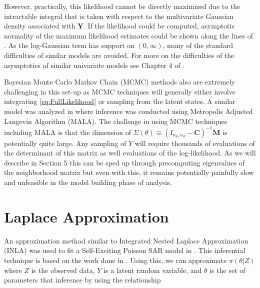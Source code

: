 \documentclass[11pt]{isuthesis}
\begin{document}
	However, practically, this likelihood cannot be directly maximized due to the intractable integral that is taken with respect to the multivariate Gaussian density associated with $\boldsymbol{Y}$.  If the likelihood could be computed, asymptotic normality of the maximum likelihood estimates could be shown along the lines of \cite{fokianos2009poisson}.  As the log-Gaussian term has support on $(0,\infty)$, many of the standard difficulties of similar models are avoided.  For more on the difficulties of the asymptotics of similar univariate models see Chapter 4 of \cite{davis2016handbook}. 
	
	Bayesian Monte Carlo Markov Chain (MCMC) methods also are extremely challenging in this set-up as MCMC techniques will generally either involve integrating \eqref{eq:FullLikelihood} or sampling from the latent states.  A similar model was analyzed in \cite{mohler2013modeling} where inference was conducted using Metropolis Adjusted Langevin Algorithm (MALA).  The challenge in using MCMC techniques including MALA is that the dimension of $\Sigma(\theta) \equiv (I_{n_d,n_d}-\boldsymbol{C})^{-1}\boldsymbol{M}$ is potentially quite large.  Any sampling of $Y$ will require thousands of evaluations of the determinant of this matrix as well evaluations of the log-likelihood.  As we will describe in Section 5 this can be sped up through precomputing eigenvalues of the neighborhood matrix but even with this, it remains potentially painfully slow and unfeasible in the model building phase of analysis.
	
	
	
	\section{Laplace Approximation}
	
	An approximation method similar to Integrated Nested Laplace Approximation (INLA) was used to fit a Self-Exciting Poisson SAR model in \cite{2017arXiv170308429C}.  This inferential technique is based on the work done in \cite{tierney1986accurate}.  Using this, we can approximate $\pi(\theta|Z)$ where $Z$ is the observed data, $Y$ is a latent random variable, and $\theta$ is the set of parameters that inference by using the relationship
	
\end{document}
